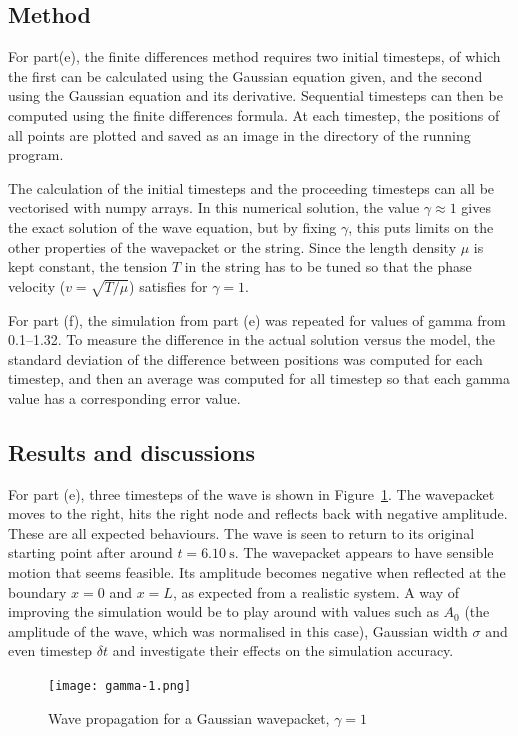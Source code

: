 \documentclass[hyphens,twocolumn,nobalancelastpage,aps,10pt,citeautoscript,longbibliography]{revtex4-2}
\begin{document}
\subsection{Method}%
\label{sub:method_2}

\noindent For part(e), the finite differences method requires two initial
timesteps, of which the first can be calculated using the Gaussian equation
given, and the second using the Gaussian equation and its derivative.
Sequential timesteps can then be computed using the finite differences formula.
At each timestep, the positions of all points are plotted and saved as an image
in the directory of the running program.

The calculation of the initial timesteps and the proceeding timesteps can all
be vectorised with numpy arrays. In this numerical solution, the value $\gamma
	\approx 1$ gives the exact solution of the wave equation, but by fixing
$\gamma$, this puts limits on the other properties of the wavepacket or the
string. Since the length density $\mu$ is kept constant, the tension $T$ in the
string has to be tuned so that the phase velocity ($v = \sqrt{T/\mu}$)
satisfies for $\gamma = 1$.

For part (f), the simulation from part (e) was repeated for values of gamma
from 0.1--1.32. To measure the difference in the actual solution versus the
model, the standard deviation of the difference between positions was computed
for each timestep, and then an average was computed for all timestep so that
each gamma value has a corresponding error value.

\subsection{Results and discussions}%
\label{sub:results_and_discussions_2}

\noindent For part (e), three timesteps of the wave is shown in Figure~\ref{fig:gamma_1}.
The wavepacket moves to the right, hits the right node and reflects back with
negative amplitude. These are all expected behaviours. The wave is seen to
return to its original starting point after around $t = \qty{6.10}{\second}$.
The wavepacket appears to have sensible motion that seems feasible. Its
amplitude becomes negative when reflected at the boundary $x=0$ and $x=L$, as
expected from a realistic system. A way of improving the simulation would be to
play around with values such as $A_0$ (the amplitude of the wave, which was
normalised in this case), Gaussian width $\sigma$ and even timestep $\delta t$
and investigate their effects on the simulation accuracy.
\begin{figure}[htpb]
	\centering
	\texttt{[image: gamma-1.png]}
	\caption{Wave propagation for a Gaussian wavepacket, $\gamma = 1$}%
	\label{fig:gamma_1}
\end{figure}
\end{document}
